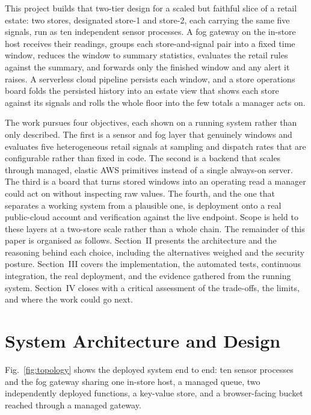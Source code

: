 \documentclass[conference]{IEEEtran}
\begin{document}
This project builds that two-tier design for a scaled but faithful slice of a retail estate: two stores, designated store-1 and store-2, each carrying the same five signals, run as ten independent sensor processes. A fog gateway on the in-store host receives their readings, groups each store-and-signal pair into a fixed time window, reduces the window to summary statistics, evaluates the retail rules against the summary, and forwards only the finished window and any alert it raises. A serverless cloud pipeline persists each window, and a store operations board folds the persisted history into an estate view that shows each store against its signals and rolls the whole floor into the few totals a manager acts on.

The work pursues four objectives, each shown on a running system rather than only described. The first is a sensor and fog layer that genuinely windows and evaluates five heterogeneous retail signals at sampling and dispatch rates that are configurable rather than fixed in code. The second is a backend that scales through managed, elastic AWS primitives instead of a single always-on server. The third is a board that turns stored windows into an operating read a manager could act on without inspecting raw values. The fourth, and the one that separates a working system from a plausible one, is deployment onto a real public-cloud account and verification against the live endpoint. Scope is held to these layers at a two-store scale rather than a whole chain. The remainder of this paper is organised as follows. Section~II presents the architecture and the reasoning behind each choice, including the alternatives weighed and the security posture. Section~III covers the implementation, the automated tests, continuous integration, the real deployment, and the evidence gathered from the running system. Section~IV closes with a critical assessment of the trade-offs, the limits, and where the work could go next.

\section{System Architecture and Design}

Fig.~\ref{fig:topology} shows the deployed system end to end: ten sensor processes and the fog gateway sharing one in-store host, a managed queue, two independently deployed functions, a key-value store, and a browser-facing bucket reached through a managed gateway.
\end{document}
